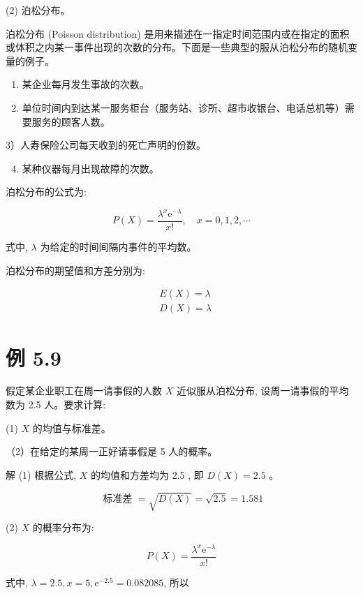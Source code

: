 \documentclass[10pt]{article}
\begin{document}
\begin{CJK*}{UTF8}{bsmi}
(2) 泊松分布。

泊松分布 (Poisson distribution) 是用来描述在一指定时间范围内或在指定的面积或体积之内某一事件出现的次数的分布。下面是一些典型的服从泊松分布的随机变量的例子。

\begin{enumerate}
  \item 某企业每月发生事故的次数。

  \item 单位时间内到达某一服务柜台（服务站、诊所、超市收银台、电话总机等）需要服务的顾客人数。

\end{enumerate}

3）人寿保险公司每天收到的死亡声明的份数。

\begin{enumerate}
  \setcounter{enumi}{3}
  \item 某种仪器每月出现故障的次数。
\end{enumerate}

泊松分布的公式为:


\begin{equation*}
P(X)=\frac{\lambda^{x} \mathrm{e}^{-\lambda}}{x !}, \quad x=0,1,2, \cdots \tag{5.13}
\end{equation*}


式中, $\lambda$ 为给定的时间间隔内事件的平均数。

泊松分布的期望值和方差分别为:

$$
\begin{aligned}
& E(X)=\lambda \\
& D(X)=\lambda
\end{aligned}
$$

\section*{例 5.9}
假定某企业职工在周一请事假的人数 $X$ 近似服从泊松分布, 设周一请事假的平均数为 2.5 人。要求计算:

(1) $X$ 的均值与标准差。

（2）在给定的某周一正好请事假是 5 人的概率。

解 (1) 根据公式, $X$ 的均值和方差均为 2.5 , 即 $D(X)=2.5$ 。

$$
\text { 标准差 }=\sqrt{D(X)}=\sqrt{2.5}=1.581
$$

(2) $X$ 的概率分布为:

$$
P(X)=\frac{\lambda^{x} \mathrm{e}^{-\lambda}}{x !}
$$

式中, $\lambda=2.5, x=5, \mathrm{e}^{-2.5}=0.082085$, 所以


\end{CJK*}
\end{document}
